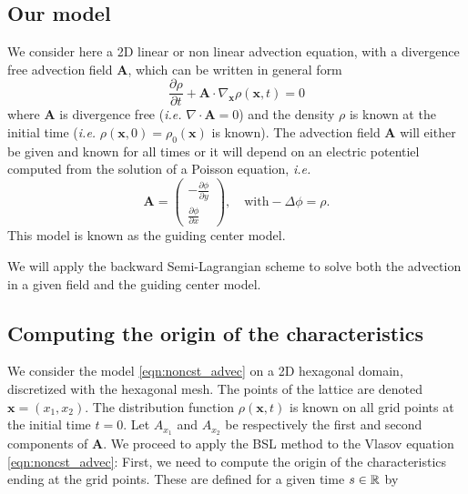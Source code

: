 \documentclass[proc]{edpsmath}
\begin{document}
\subsection{Our model}

We consider here a 2D linear or non linear advection equation, with a divergence free advection field $ \mathbf{A}$, which can be written in general form
\begin{equation}
	\dfrac{\partial \rho}{\partial t} + \mathbf{A} \cdot \nabla_{\mathbf{x}} \rho(\mathbf{x}, t)  = 0
	\label{eqn:noncst_advec}
\end{equation}
where $\mathbf{A}$ is divergence free (\emph{i.e.} $\nabla \cdot \mathbf{A} = 0$) and the density $\rho$ is known at the initial time (\emph{i.e.} $\rho(\mathbf{x}, 0) = \rho_0(\mathbf{x})$ is known). The advection field $ \mathbf{A}$ will either be given and known for all times or it will depend on an electric potentiel computed from the solution of a Poisson equation, \emph{i.e. } 
$$ \mathbf{A}= \begin{pmatrix}
-\frac{\partial \phi}{\partial y} \\ \frac{\partial \phi}{\partial x}
\end{pmatrix}
, ~~~\mbox{ with} -\Delta\phi = \rho.$$ 
This model is known as the guiding center model.

We will apply the backward Semi-Lagrangian scheme to solve both the advection in a given field and the guiding center model.


\subsection{Computing the origin of the characteristics}



We consider the model \eqref{eqn:noncst_advec} on a 2D hexagonal domain, discretized with the hexagonal mesh. The points of the lattice are denoted $\mathbf{x}=(x_1, x_2)$. The distribution function $\rho(\mathbf{x},t)$ is known on all grid points at the initial time $t=0$. Let $A_{x_1}$ and $A_{x_2}$ be respectively the first and second components of $\mathbf{A}$. We proceed to apply the BSL method to the Vlasov equation \eqref{eqn:noncst_advec}: First, we need to compute the origin of the characteristics ending at the grid points. These are defined for  a given time $s \in \mathbb{R} $ by
\end{document}
